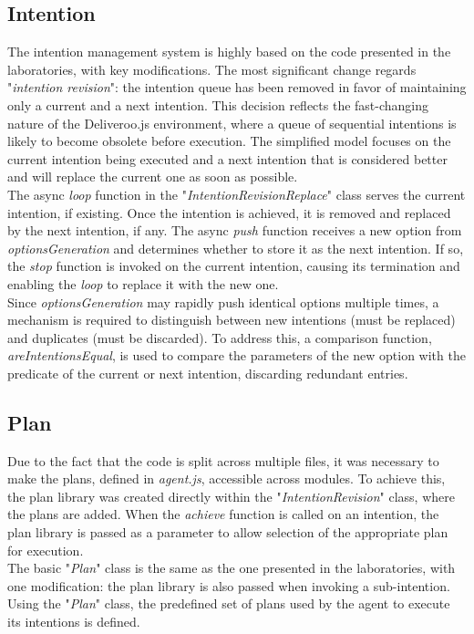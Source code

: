     \subsection{Intention}
        The intention management system is highly based on the code presented in the laboratories, with key modifications. The most significant change regards "\textit{intention revision}": the intention queue has been removed in favor of maintaining only a current and a next intention. This decision reflects the fast-changing nature of the Deliveroo.js environment, where a queue of sequential intentions is likely to become obsolete before execution. The simplified model focuses on the current intention being executed and a next intention that is considered better and will replace the current one as soon as possible.
        \medskip\\
        The async \textit{loop} function in the "\textit{IntentionRevisionReplace}" class serves the current intention, if existing. Once the intention is achieved, it is removed and replaced by the next intention, if any. The async \textit{push} function receives a new option from \textit{optionsGeneration} and determines whether to store it as the next intention. If so, the \textit{stop} function is invoked on the current intention, causing its termination and enabling the \textit{loop} to replace it with the new one.
        \medskip\\
        Since \textit{optionsGeneration} may rapidly push identical options multiple times, a mechanism is required to distinguish between new intentions (must be replaced) and duplicates (must be discarded). To address this, a comparison function, \textit{areIntentionsEqual}, is used to compare the parameters of the new option with the predicate of the current or next intention, discarding redundant entries.

    \subsection{Plan}
        Due to the fact that the code is split across multiple files, it was necessary to make the plans, defined in \textit{agent.js}, accessible across modules. To achieve this, the plan library was created directly within the "\textit{IntentionRevision}" class, where the plans are added. When the \textit{achieve} function is called on an intention, the plan library is passed as a parameter to allow selection of the appropriate plan for execution.
        \medskip\\
        The basic "\textit{Plan}" class is the same as the one presented in the laboratories, with one modification: the plan library is also passed when invoking a sub-intention.
        \medskip\\
        Using the "\textit{Plan}" class, the predefined set of plans used by the agent to execute its intentions is defined.

